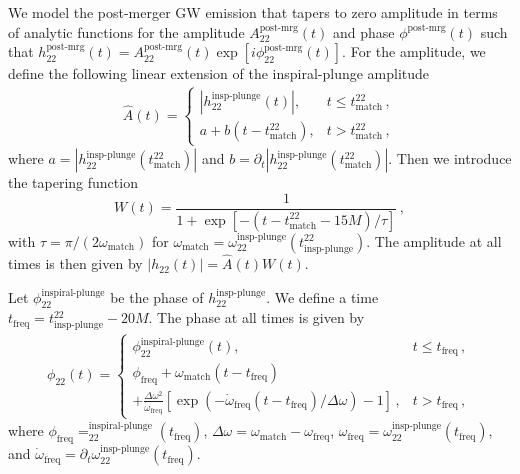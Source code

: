 \documentclass[prd,aps,letter,twocolumn,floatfix,notitlepage,nofootinbib]{revtex4-1}
\begin{document}
We model the post-merger GW emission that tapers to zero amplitude in terms of analytic functions for the amplitude $A_{22}^{\textrm{post-mrg}}(t)$ and phase $\phi^{\textrm{post-mrg}}(t)$ such that $h_{22}^{\textrm{post-mrg}}(t) = A_{22}^{\textrm{post-mrg}}(t) \exp{[i\phi_{22}^{\textrm{post-mrg}}(t)]}$. For the amplitude, we define the following linear extension of the inspiral-plunge amplitude
\begin{align}
\hat{A}(t)=\left\{\begin{array}{ll}
|h_{22}^{\textrm{insp-plunge}}(t)|, & t \leq t^{22}_{\textrm{match}}\,, \\
a + b (t-t^{22}_{\textrm{match}}) , & t > t^{22}_{\textrm{match}}\,,
\end{array}\right.
\end{align}
where $a=|h_{22}^{\textrm{insp-plunge}}(t^{22}_{\textrm{match}})|$ and $b=\partial_t |h_{22}^{\textrm{insp-plunge}}(t^{22}_{\textrm{match}})|$.
Then we introduce the tapering function \begin{equation}
W(t) = \frac{1}{1+\exp{[-(t- t^{22}_{\textrm{match}}-15M)/\tau]}}\,,
\end{equation}
with $\tau=\pi/(2\omega_{\textrm{match}})$ for $\omega_{\textrm{match}} =\omega_{22}^{\textrm{insp-plunge}}(t^{22}_{\textrm{insp-plunge}})$. The amplitude at all times is then given by $|h_{22}(t)|=\hat{A}(t)W(t)$.

Let $\phi_{22}^{\textrm{inspiral-plunge}}$ be the phase of $h_{22}^{\textrm{insp-plunge}}$. We define a time $t_{\textrm{freq}}=t^{22}_{\textrm{insp-plunge}}-20M$. The phase at all times is given by
\begin{align}
\phi_{22}(t)=\left\{\begin{array}{ll}
\phi_{22}^{\textrm{inspiral-plunge}}(t), & t \leq t_{\textrm{freq}}\,, \\
\phi_{\textrm{freq}} + \omega_{\textrm{match}}(t-t_{\textrm{freq}})  & \\
+\frac{\Delta\omega^2}{\dot{\omega}_{\textrm{freq}}} [\exp{(-\dot{\omega}_{\textrm{freq}}(t-t_{\textrm{freq}})/\Delta\omega)}-1]\,,& t > t_{\textrm{freq}}\,,
\end{array}\right.
\end{align}
where $\phi_{\textrm{freq}}=_{22}^{\textrm{inspiral-plunge}}(t_{\textrm{freq}})$, $\Delta\omega=\omega_{\textrm{match}} - \omega_{\textrm{freq}}$, $\omega_{\textrm{freq}}=\omega_{22}^{\textrm{insp-plunge}}(t_{\textrm{freq}})$, and $\dot{\omega}_{\textrm{freq}}=\partial_t\omega_{22}^{\textrm{insp-plunge}}(t_{\textrm{freq}})$.
\end{document}
